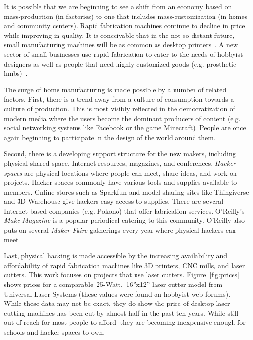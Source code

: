 \documentclass[11pt]{article}
\begin{document}
It is possible that we are beginning to see a shift from an economy
based on mass-production (in factories) to one that includes
mass-customization (in homes and community centers). Rapid fabrication
machines continue to decline in price while improving in quality. It
is conceivable that in the not-so-distant future, small manufacturing
machines will be as common as desktop printers~\cite{economist-fab}. A
new sector of small businesses use rapid fabrication to cater to the
needs of hobbyist designers as well as people that need highly
customized goods (e.g. prosthetic limbs)~\cite{nyt-rapidfab}.

The surge of home manufacturing is made possible by a number of
related factors. First, there is a trend away from a culture of
consumption towards a culture of production. This is most visibly
reflected in the democratization of modern media where the users
become the dominant producers of content (e.g. social networking
systems like Facebook or the game Minecraft). People are once again
beginning to participate in the design of the world around them.

Second, there is a developing support structure for the new makers,
including physical shared space, Internet resources, magazines, and
conferences. \textit{Hacker spaces} are physical locations where
people can meet, share ideas, and work on projects. Hacker spaces
commonly have various tools and supplies available to members. Online
stores such as Sparkfun and model sharing sites like Thingiverse and
3D Warehouse give hackers easy access to supplies. There are several
Internet-based companies (e.g. Pokono) that offer fabrication
services. O'Reilly's \textit{Make Magazine} is a popular periodical
catering to this community. O'Reilly also puts on several
\textit{Maker Faire} gatherings every year where physical hackers can
meet.

Last, physical hacking is made accessible by the increasing
availability and affordability of rapid fabrication machines like 3D
printers, CNC mills, and laser cutters. This work focuses on projects
that use laser cutters. Figure~\ref{fig:prices} shows prices for a
comparable~25-Watt,~16''x12'' laser cutter model from Universal Laser
Systems (these values were found on hobbyist web forums). While these
data may not be exact, they do show the price of desktop laser cutting
machines has been cut by almost half in the past ten years. While
still out of reach for most people to afford, they are becoming
inexpensive enough for schools and hacker spaces to own.
\end{document}
